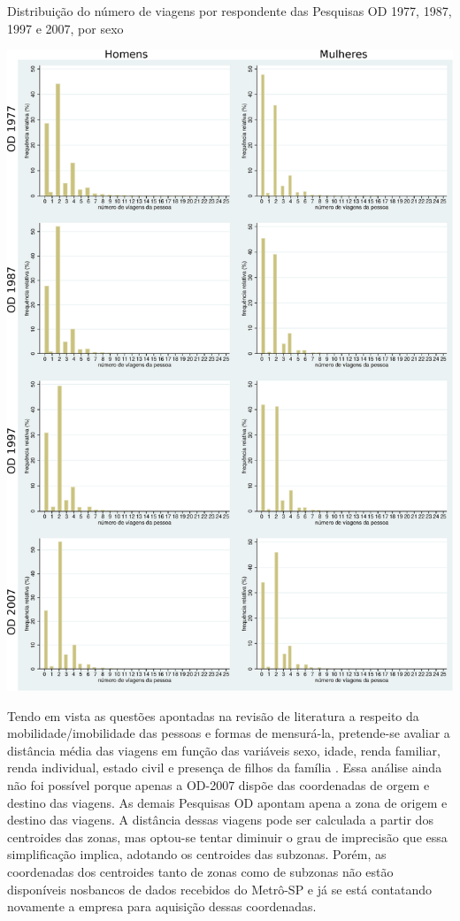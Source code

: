 \begin{grafico}[htb]%
    \caption{\label{graf:distr-num-viag}Distribuição do número de viagens por respondente das Pesquisas OD 1977, 1987, 1997 e 2007, por sexo}%
    \begin{center}%
        \includegraphics[width=1\textwidth]{./imagens/qtdeviagens2.eps}%
    \end{center}%
\end{grafico}%

Tendo em vista as questões apontadas na revisão de literatura a respeito da mobilidade/imobilidade das pessoas e formas de mensurá-la, pretende-se avaliar a distância média das viagens em função das variáveis sexo, idade, renda familiar, renda individual, estado civil e presença de filhos da família \cite{ROSENBLOOM2006,SHEARMUR2006,HANSON2010}. Essa análise ainda não foi possível porque apenas a OD-2007 dispõe das coordenadas de orgem e destino das viagens. As demais Pesquisas OD apontam apena a zona de origem e destino das viagens. A distância dessas viagens pode ser calculada a partir dos centroides das zonas, mas optou-se tentar diminuir o grau de imprecisão que essa simplificação implica, adotando os centroides das subzonas. Porém, as coordenadas dos centroides tanto de zonas como de subzonas não estão disponíveis nosbancos de dados recebidos do Metrô-SP e já se está contatando novamente a empresa para aquisição dessas coordenadas.

